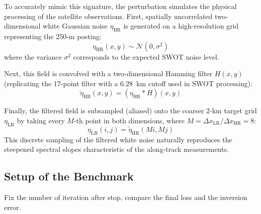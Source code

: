 \documentclass[../SQG_notes.tex]{subfiles}
\begin{document}
    To accurately mimic this signature, the perturbation simulates the physical processing of the satellite observations. First, spatially uncorrelated two-dimensional white Gaussian noise $\eta_{\text{HR}}$ is generated on a high-resolution grid representing the 250-m posting:
    \begin{equation}
        \eta_{\text{HR}}(x, y) \sim \mathcal{N}(0, \sigma^2)
    \end{equation}
    where the variance $\sigma^2$ corresponds to the expected SWOT noise level. 
    
    Next, this field is convolved with a two-dimensional Hamming filter $H(x,y)$ (replicating the 17-point filter with a 6.28~km cutoff used in SWOT processing):
    \begin{equation}
        \tilde{\eta}_{\text{HR}}(x, y) = (\eta_{\text{HR}} * H)(x, y)
    \end{equation}
    
    Finally, the filtered field is subsampled (aliased) onto the coarser 2-km target grid $\eta_{\text{LR}}$ by taking every $M$-th point in both dimensions, where $M = \Delta x_{\text{LR}} / \Delta x_{\text{HR}} = 8$:
    \begin{equation}
        \eta_{\text{LR}}(i, j) = \tilde{\eta}_{\text{HR}}(Mi, Mj)
    \end{equation}
    This discrete sampling of the filtered white noise naturally reproduces the steepened spectral slopes characteristic of the along-track measurements.

    \subsection{Setup of the Benchmark}
    Fix the number of iteration after stop, compare the final loss and the inversion error. 
\end{document}
